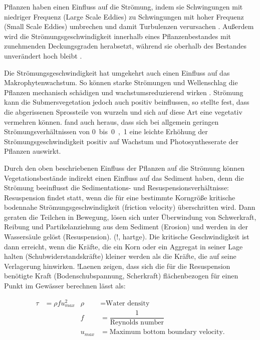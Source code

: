 Pflanzen haben einen Einfluss auf die Strömung, indem sie Schwingungen mit niedriger Frequenz (Large Scale Eddies) zu Schwingungen mit hoher Frequenz (Small Scale Eddies) umbrechen und damit Turbulenzen verursachen \citep{leonard_2006}. Außerdem wird die Strömungsgeschwindigkeit innerhalb eines Pflanzenbestandes mit zunehmenden Deckungsgraden herabsetzt, während sie oberhalb des Bestandes unverändert hoch bleibt \citep{li_2014}.

Die Strömungsgeschwindigkeit hat umgekehrt auch einen Einfluss auf das Makrophytenwachstum. So können starke Strömungen und Wellenschlag die Pflanzen mechanisch schädigen und wachstumsreduzierend wirken \citep{biggs_1996}. Strömung kann die Submersvegetation jedoch auch positiv beinflussen, so stellte \citep{madsen_1997} fest, dass die abgerissenen Sprossteile von  wurzeln und sich auf diese Art eine vegetativ vermehren können. \cite{madsen_1983} fand auch heraus,  dass sich bei allgemein geringen Strömungsverhältnissen von \unit{0 bis 0,1}{\metre\per\second} eine leichte Erhöhung der Strömungsgeschwindigkeit  positiv auf Wachstum und Photosyntheserate der Pflanzen auswirkt.

Durch den oben beschriebenen Einfluss der Pflanzen auf die Strömung können Vegetationsbestände indirekt einen Einfluss auf das Sediment haben, denn die Strömung beeinflusst die Sedimentations- und Resuspensionsverhältnisse: 
Resuspension findet statt, wenn die für eine bestimmte Korngröße kritische bodennahe Strömungsgeschwindigkeit (friction velocity) überschritten wird. Dann geraten die Teilchen in Bewegung, lösen sich unter Überwindung von Schwerkraft, Reibung und Partikelanziehung aus dem Sediment (Erosion) und werden in der Wassersäule gelöst (Resuspension). \citep{madsen_2001} (!, hartge). Die kritische Geschwindigkeit ist dann erreicht, wenn die Kräfte, die ein Korn oder ein Aggregat in seiner Lage halten (Schubwiderstandskräfte) kleiner werden als die Kräfte, die auf seine Verlagerung hinwirken. !Laenen zeigen, dass sich die für die Resuspension benötigte Kraft (Bodenschubspannung, Scherkraft) flächenbezogen für einen Punkt im Gewässer berechnen lässt als:

\begin{align*}
\tau &= \rho f u_{max}^{2} & \rho &=\text{Water density}\\ 
     &     				   &  f   &= \dfrac{1}{\text{Reynolds number}}\\
     &					   & u_{max} &= \text{Maximum bottom boundary velocity}.
\end{align*}



